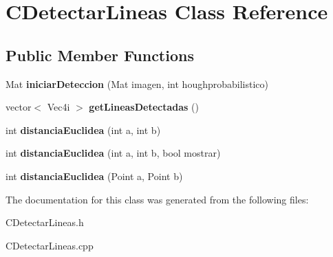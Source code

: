 \hypertarget{classCDetectarLineas}{}\section{C\+Detectar\+Lineas Class Reference}
\label{classCDetectarLineas}
\subsection*{Public Member Functions}
\begin{DoxyCompactItemize}
\item 
Mat {\bfseries iniciar\+Deteccion} (Mat imagen, int houghprobabilistico)\hypertarget{classCDetectarLineas_a8380e777f5cac60aae54ac0cf13b7246}{}\label{classCDetectarLineas_a8380e777f5cac60aae54ac0cf13b7246}

\item 
vector$<$ Vec4i $>$ {\bfseries get\+Lineas\+Detectadas} ()\hypertarget{classCDetectarLineas_ad3c473d7e85a3c4901870af10ff9d5ed}{}\label{classCDetectarLineas_ad3c473d7e85a3c4901870af10ff9d5ed}

\item 
int {\bfseries distancia\+Euclidea} (int a, int b)\hypertarget{classCDetectarLineas_ad7493ac0d73201a7c9188f8a283b6a88}{}\label{classCDetectarLineas_ad7493ac0d73201a7c9188f8a283b6a88}

\item 
int {\bfseries distancia\+Euclidea} (int a, int b, bool mostrar)\hypertarget{classCDetectarLineas_abe5bf1860071f33e7339742fd88e6e78}{}\label{classCDetectarLineas_abe5bf1860071f33e7339742fd88e6e78}

\item 
int {\bfseries distancia\+Euclidea} (Point a, Point b)\hypertarget{classCDetectarLineas_a88fe565263283487188f7c032a661d2f}{}\label{classCDetectarLineas_a88fe565263283487188f7c032a661d2f}

\end{DoxyCompactItemize}


The documentation for this class was generated from the following files\+:\begin{DoxyCompactItemize}
\item 
C\+Detectar\+Lineas.\+h\item 
C\+Detectar\+Lineas.\+cpp\end{DoxyCompactItemize}
